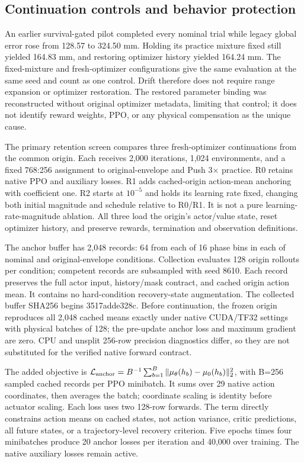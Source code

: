 \documentclass[letterpaper,10pt,conference]{ieeeconf}
\begin{document}
\subsection{Continuation controls and behavior protection}

An earlier survival-gated pilot completed every nominal trial while legacy global error rose from 128.57 to 324.50 mm. Holding its practice mixture fixed still yielded 164.83 mm, and restoring optimizer history yielded 164.24 mm. The fixed-mixture and fresh-optimizer configurations give the same evaluation at the same seed and count as one control. Drift therefore does not require range expansion or optimizer restoration. The restored parameter binding was reconstructed without original optimizer metadata, limiting that control; it does not identify reward weights, PPO, or any physical compensation as the unique cause.

The primary retention screen compares three fresh-optimizer continuations from the common origin. Each receives 2,000 iterations, 1,024 environments, and a fixed 768:256 assignment to original-envelope and Push 3$\times$ practice. R0 retains native PPO and auxiliary losses. R1 adds cached-origin action-mean anchoring with coefficient one. R2 starts at $10^{-5}$ and holds its learning rate fixed, changing both initial magnitude and schedule relative to R0/R1. It is not a pure learning-rate-magnitude ablation. All three load the origin's actor/value state, reset optimizer history, and preserve rewards, termination and observation definitions.

The anchor buffer has 2,048 records: 64 from each of 16 phase bins in each of nominal and original-envelope conditions. Collection evaluates 128 origin rollouts per condition; competent records are subsampled with seed 8610. Each record preserves the full actor input, history/mask contract, and cached origin action mean. It contains no hard-condition recovery-state augmentation. The collected buffer SHA256 begins 3517adde328c. Before continuation, the frozen origin reproduces all 2,048 cached means exactly under native CUDA/TF32 settings with physical batches of 128; the pre-update anchor loss and maximum gradient are zero. CPU and unsplit 256-row precision diagnostics differ, so they are not substituted for the verified native forward contract.

The added objective is $\mathcal L_{\rm anchor}=B^{-1}\sum_{b=1}^{B}\|\mu_\theta(h_b)-\mu_0(h_b)\|_2^2$, with B=256 sampled cached records per PPO minibatch. It sums over 29 native action coordinates, then averages the batch; coordinate scaling is identity before actuator scaling. Each loss uses two 128-row forwards. The term directly constrains action means on cached states, not action variance, critic predictions, all future states, or a trajectory-level recovery criterion. Five epochs times four minibatches produce 20 anchor losses per iteration and 40,000 over training. The native auxiliary losses remain active.
\end{document}
